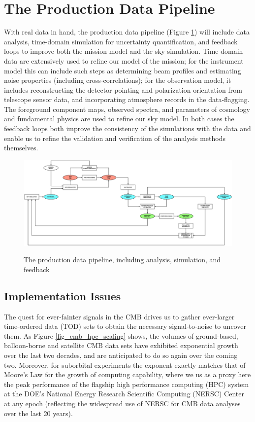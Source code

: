  
\section{The Production Data Pipeline}

With real data in hand, the production data pipeline (Figure \ref{fig_prod}) will include data analysis, time-domain simulation for uncertainty quantification, and feedback loops to improve both the mission model and the sky simulation. Time domain data are extensively used to refine our model of the mission; for the instrument model this can include such steps as determining beam profiles and estimating noise properties (including cross-correlations); for the observation model, it includes reconstructing the detector pointing and polarization orientation from telescope sensor data, and incorporating atmosphere records in the data-flagging. The foreground component maps, observed spectra, and parameters of cosmology and fundamental physics are used to refine our sky model. In both cases the feedback loops both improve the consistency of the simulations with the data and enable us to refine the validation and verification of the analysis methods themselves.

\begin{figure}[htbp]
\includegraphics[width=1.0\textwidth]{Analysis/production}\\
\caption{The production data pipeline, including analysis, simulation, and feedback}
\label{fig_prod}
\end{figure}

\subsection{Implementation Issues}

The quest for ever-fainter signals in the CMB drives us to gather ever-larger time-ordered data (TOD) sets to obtain the necessary signal-to-noise to uncover them. As Figure \ref{fig_cmb_hpc_scaling} shows, the volumes of ground-based, balloon-borne and satellite CMB data sets have exhibited exponential growth over the last two decades, and are anticipated to do so again over the coming two. Moreover, for suborbital experiments the exponent exactly matches that of Moore's Law for the growth of computing capability, where we us as a proxy here the peak performance of the flagship high performance computing (HPC) system at the DOE's National Energy Research Scientific Computing (NERSC) Center at any epoch (reflecting the widespread use of NERSC for CMB data analyses over the last 20 years). 

